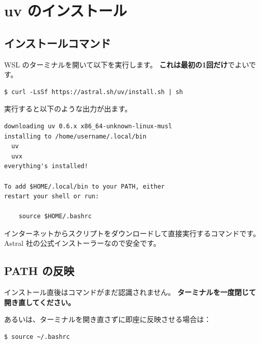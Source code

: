 \chapter{uv のインストール}

\section{インストールコマンド}

WSL のターミナルを開いて以下を実行します。
\textbf{これは最初の1回だけ}でよいです。

\begin{wslbox}[uv のインストール]
\begin{lstlisting}[style=bash]
$ curl -LsSf https://astral.sh/uv/install.sh | sh
\end{lstlisting}
\end{wslbox}

実行すると以下のような出力が出ます。

\begin{wslbox}[インストール時の出力例]
\begin{lstlisting}[style=bash]
downloading uv 0.6.x x86_64-unknown-linux-musl
installing to /home/username/.local/bin
  uv
  uvx
everything's installed!

To add $HOME/.local/bin to your PATH, either
restart your shell or run:

    source $HOME/.bashrc
\end{lstlisting}
\end{wslbox}

\begin{notebox}
インターネットからスクリプトをダウンロードして直接実行するコマンドです。
Astral 社の公式インストーラーなので安全です。
\end{notebox}

\section{PATH の反映}

インストール直後はコマンドがまだ認識されません。
\textbf{ターミナルを一度閉じて開き直してください。}

あるいは、ターミナルを開き直さずに即座に反映させる場合は：

\begin{wslbox}
\begin{lstlisting}[style=bash]
$ source ~/.bashrc
\end{lstlisting}
\end{wslbox}

